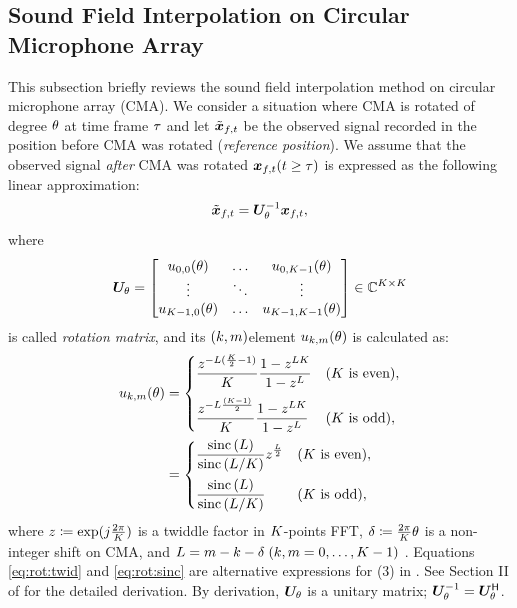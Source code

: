 \documentclass[sip,biber]{now-journal}
\begin{document}
\subsection{Sound Field Interpolation on Circular Microphone Array}
This subsection briefly reviews the sound field interpolation method on circular microphone array (CMA).
We consider a situation where CMA is rotated of degree $\theta$ at time frame $\tau$ and let $\refpos{\Obs} _{\ft}$ be the observed signal recorded in the position before CMA was rotated (\emph{reference position}).
We assume that the observed signal \emph{after} CMA was rotated $\Obs _{\ft} (\tframe \geq \rotFra)$ is expressed as the following linear approximation:
\begin{equation}
  \refpos{\Obs} _{\ft} = \rotMat _{\rotSpat} ^{-1} \Obs _{\ft},
\end{equation}
where
\begin{equation}
  \bm{U} _{\theta} =
  \begin{bmatrix}
    u _{0, 0}(\theta) & \dots & u _{0, K - 1}(\theta) \\
    \vdots & \ddots & \vdots \\
    u _{K - 1, 0}(\theta) & \dots & u _{K - 1, K - 1}(\theta)
  \end{bmatrix}
  \in \mathbb{C} ^{K\times K}
\end{equation}
is called \emph{rotation matrix}, and its $(k,m)$element $u _{k,m} (\theta)$ is calculated as:
\begin{align}
  u _{k,m}(\theta) &=
    \begin{cases}
      \displaystyle\frac{z ^{- L (\frac{K}{2} - 1) }}{K} \frac{1 - z ^{L K}}{1 - z ^{L}} & (\text{$K$ is even}),\\[1em]
      \displaystyle\frac{z ^{- L \frac{(K - 1)}{2}}}{K} \frac{1 - z ^{L K}}{1 - z ^{L}} & (\text{$K$ is odd}),
    \end{cases}\label{eq:rot:twid} \\
  &=
    \begin{cases}
      \displaystyle \frac{\operatorname{sinc}{(L)}}{\operatorname{sinc}{\left(L / K\right)}} z ^{\frac{L}{2}} & (\text{$K$ is even}),\\[1em]
      \displaystyle \frac{\operatorname{sinc}{(L)}}{\operatorname{sinc}{\left(L / K\right)}} & (\text{$K$ is odd}),
    \end{cases}\label{eq:rot:sinc}
\end{align}
where $z \coloneqq \exp (j \frac{2\pi}{K})$ is a twiddle factor in $K$-points FFT,
$\delta \coloneqq \frac{2\pi}{K} \theta$ is a non-integer shift on CMA,
and $L = m - k - \delta\; (k, m = 0, \dots, K - 1)$ \cite{Wakabayashi:2023:ASLP}.
Equations \eqref{eq:rot:twid} and \eqref{eq:rot:sinc} are alternative expressions for (3) in \cite{Wakabayashi:2023:ASLP}.
See Section II of \cite{Wakabayashi:2023:ASLP} for the detailed derivation.
By derivation, $\bm{U} _{\theta}$ is a unitary matrix; $\bm{U} _{\theta} ^{-1} = \bm{U} _{\theta} ^{\mathsf{H}}$.
\end{document}
